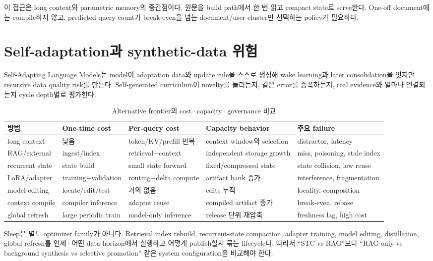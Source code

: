 이 접근은 long context와 parametric memory의 중간점이다. 원문을 build path에서 한 번 읽고 compact
state로 serve한다. One-off document에는 compile하지 않고, predicted query count가 break-even을 넘는
document/user cluster만 선택하는 policy가 필요하다.

\section{Self-adaptation과 synthetic-data 위험}

Self-Adapting Language Models는 model이 adaptation data와 update rule을 스스로 생성해 wake learning과
later consolidation을 잇지만 recursive data quality risk를 만든다.
\parencite{srcstc0029,srcstc0041} Self-generated curriculum이 novelty를 늘리는지, 같은 error를 증폭하는지,
real evidence와 얼마나 연결되는지 cycle depth별로 평가한다.

\begin{table}[htbp]
\centering
\caption{Alternative frontier의 cost·capacity·governance 비교}
\label{tab:alternative-frontier}
\scriptsize
\begin{tabularx}{\textwidth}{p{} p{} p{} p{} X}
\toprule
방법 & One-time cost & Per-query cost & Capacity behavior & 주요 failure \\
\midrule
long context & 낮음 & token/KV/prefill 반복 & context window와 selection & distractor, latency \\
RAG/external & ingest/index & retrieval+context & independent storage growth & miss, poisoning, stale index \\
recurrent state & state build & small state forward & fixed/compressed state & state collision, low reuse \\
LoRA/adapter & training+validation & routing+delta compute & artifact bank 증가 & interference, fragmentation \\
model editing & locate/edit/test & 거의 없음 & edits 누적 & locality, composition \\
context compile & compiler inference & adapter reuse & compiled artifact 증가 & break-even, rebase \\
global refresh & large periodic train & model-only inference & release 단위 재압축 & freshness lag, high cost \\
\bottomrule
\end{tabularx}
\end{table}

\begin{keypoint}
Sleep은 별도 optimizer family가 아니다. Retrieval index rebuild, recurrent-state compaction, adapter
training, model editing, distillation, global refresh를 언제·어떤 data horizon에서 실행하고 어떻게
publish할지 묶는 lifecycle다. 따라서 ``STC vs RAG''보다 ``RAG-only vs background synthesis vs selective
promotion'' 같은 system configuration을 비교해야 한다.
\end{keypoint}
